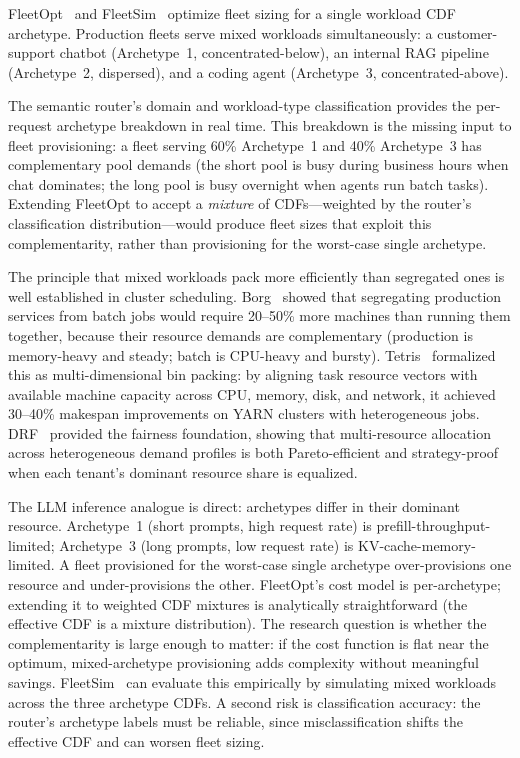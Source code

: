 \begin{opportunity}
\label{opp:mixed-archetype}
FleetOpt~\cite{fleetopt2026} and FleetSim~\cite{fleetsim2026}
optimize fleet sizing for a single workload CDF archetype.
Production fleets serve mixed workloads simultaneously: a
customer-support chatbot (Archetype~1, concentrated-below), an
internal RAG pipeline (Archetype~2, dispersed), and a coding
agent (Archetype~3, concentrated-above).

The semantic router's domain and workload-type classification
provides the per-request archetype breakdown in real time.  This
breakdown is the missing input to fleet provisioning: a fleet
serving 60\% Archetype~1 and 40\% Archetype~3 has complementary
pool demands (the short pool is busy during business hours when
chat dominates; the long pool is busy overnight when agents run
batch tasks).  Extending FleetOpt to accept a \emph{mixture} of
CDFs---weighted by the router's classification
distribution---would produce fleet sizes that exploit this
complementarity, rather than provisioning for the worst-case
single archetype.

\begin{frisk}
The principle that mixed workloads pack more efficiently than
segregated ones is well established in cluster scheduling.
Borg~\cite{verma2015borg} showed that segregating production
services from batch jobs would require 20--50\% more machines
than running them together, because their resource demands are
complementary (production is memory-heavy and steady; batch is
CPU-heavy and bursty).
Tetris~\cite{grandl2014tetris} formalized this as
multi-dimensional bin packing: by aligning task resource vectors
with available machine capacity across CPU, memory, disk, and
network, it achieved 30--40\% makespan improvements on YARN
clusters with heterogeneous jobs.
DRF~\cite{ghodsi2011drf} provided the fairness foundation,
showing that multi-resource allocation across heterogeneous
demand profiles is both Pareto-efficient and strategy-proof
when each tenant's dominant resource share is equalized.

The LLM inference analogue is direct: archetypes differ in their
dominant resource.  Archetype~1 (short prompts, high request rate)
is prefill-throughput-limited; Archetype~3 (long prompts, low
request rate) is KV-cache-memory-limited.  A fleet provisioned
for the worst-case single archetype over-provisions one resource
and under-provisions the other.  FleetOpt's cost model is
per-archetype; extending it to weighted CDF mixtures is
analytically straightforward (the effective CDF is a mixture
distribution).  The research question is whether the complementarity
is large enough to matter: if the cost function is flat near the
optimum, mixed-archetype provisioning adds complexity without
meaningful savings.  FleetSim~\cite{fleetsim2026} can evaluate this
empirically by simulating mixed workloads across the three archetype
CDFs.  A second risk is classification accuracy: the router's
archetype labels must be reliable, since misclassification shifts
the effective CDF and can worsen fleet sizing.
\end{frisk}
\end{opportunity}

